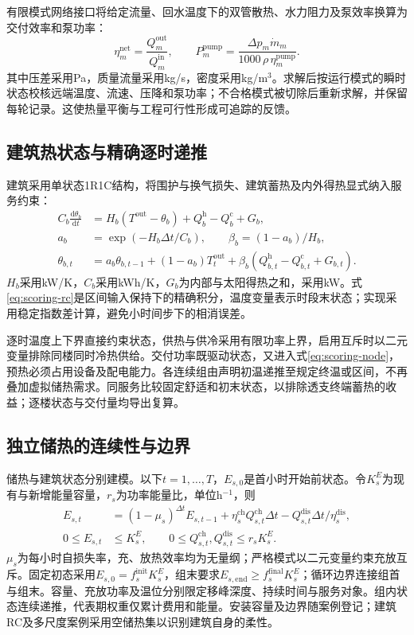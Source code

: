 有限模式网络接口将给定流量、回水温度下的双管散热、水力阻力及泵效率换算为交付效率和泵功率：
\begin{equation}
\eta_m^{\mathrm{net}}=\frac{Q_m^{\mathrm{out}}}{Q_m^{\mathrm{in}}},
\qquad
P_m^{\mathrm{pump}}=
\frac{\Delta p_m\dot m_m}{1000\,\rho\,\eta_m^{\mathrm{pump}}}.
\label{eq:scoring-network}
\end{equation}
其中压差采用Pa，质量流量采用kg/s，密度采用kg/m$^3$。求解后按运行模式的瞬时状态校核远端温度、流速、压降和泵功率；不合格模式被切除后重新求解，并保留每轮记录。这使热量平衡与工程可行性形成可追踪的反馈。

\subsection{建筑热状态与精确逐时递推}

建筑采用单状态1R1C结构，将围护与换气损失、建筑蓄热及内外得热显式纳入服务约束：
\begin{align}
C_b\frac{\mathrm d\theta_b}{\mathrm dt}
&=H_b(T^{\mathrm{out}}-\theta_b)+Q_b^{\mathrm h}-Q_b^{\mathrm c}+G_b,
\label{eq:scoring-rc-cont}\\
a_b&=\exp(-H_b\Delta t/C_b),\qquad
\beta_b=(1-a_b)/H_b,\\
\theta_{b,t}
&=a_b\theta_{b,t-1}+(1-a_b)T_t^{\mathrm{out}}
+\beta_b(Q_{b,t}^{\mathrm h}-Q_{b,t}^{\mathrm c}+G_{b,t}).
\label{eq:scoring-rc}
\end{align}
$H_b$采用kW/K，$C_b$采用kWh/K，$G_b$为内部与太阳得热之和，采用kW。式\eqref{eq:scoring-rc}是区间输入保持下的精确积分，温度变量表示时段末状态；实现采用稳定指数差计算，避免小时间步下的相消误差。

逐时温度上下界直接约束状态，供热与供冷采用有限功率上界，启用互斥时以二元变量排除同楼同时冷热供给。交付功率既驱动状态，又进入式\eqref{eq:scoring-node}，预热必须占用设备及配电能力。各连续组由声明初温递推至规定终温或区间，不再叠加虚拟储热需求。同服务比较固定舒适和初末状态，以排除透支终端蓄热的收益；逐楼状态与交付量均导出复算。

\subsection{独立储热的连续性与边界}

储热与建筑状态分别建模。以下$t=1,\ldots,T$，$E_{s,0}$是首小时开始前状态。令$K_s^E$为现有与新增能量容量，$r_s$为功率能量比，单位h$^{-1}$，则
\begin{align}
E_{s,t}
&=(1-\mu_s)^{\Delta t}E_{s,t-1}
+\eta_s^{\mathrm{ch}}Q_{s,t}^{\mathrm{ch}}\Delta t
-Q_{s,t}^{\mathrm{dis}}\Delta t/\eta_s^{\mathrm{dis}},
\label{eq:scoring-storage}\\
0\leq E_{s,t}&\leq K_s^E,\qquad
0\leq Q_{s,t}^{\mathrm{ch}},Q_{s,t}^{\mathrm{dis}}\leq r_sK_s^E .
\end{align}
$\mu_s$为每小时自损失率，充、放热效率均为无量纲；严格模式以二元变量约束充放互斥。固定初态采用$E_{s,0}=f_s^{\mathrm{init}}K_s^E$，组末要求$E_{s,\mathrm{end}}\geq f_s^{\mathrm{final}}K_s^E$；循环边界连接组首与组末。容量、充放功率及温位分别限定移峰深度、持续时间与服务对象。组内状态连续递推，代表期权重仅累计费用和能量。安装容量及边界随案例登记；建筑RC及多尺度案例采用空储热集以识别建筑自身的柔性。

